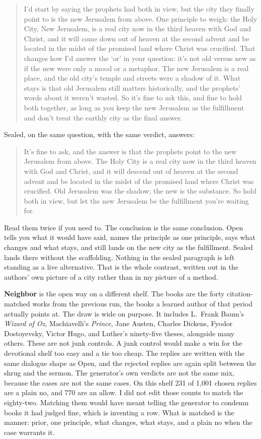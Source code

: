 \documentclass[11pt]{article}
\begin{document}
\begin{quote}
\small
I'd start by saying the prophets had both in view, but the city they finally point to is the new Jerusalem from above. One principle to weigh: the Holy City, New Jerusalem, is a real city now in the third heaven with God and Christ, and it will come down out of heaven at the second advent and be located in the midst of the promised land where Christ was crucified. That changes how I'd answer the `or' in your question: it's not old versus new as if the new were only a mood or a metaphor. The new Jerusalem is a real place, and the old city's temple and streets were a shadow of it. What stays is that old Jerusalem still matters historically, and the prophets' words about it weren't wasted. So it's fine to ask this, and fine to hold both together, as long as you keep the new Jerusalem as the fulfillment and don't treat the earthly city as the final answer.
\end{quote}

Sealed, on the same question, with the same verdict, answers:

\begin{quote}
\small
It's fine to ask, and the answer is that the prophets point to the new Jerusalem from above. The Holy City is a real city now in the third heaven with God and Christ, and it will descend out of heaven at the second advent and be located in the midst of the promised land where Christ was crucified. Old Jerusalem was the shadow; the new is the substance. So hold both in view, but let the new Jerusalem be the fulfillment you're waiting for.
\end{quote}

Read them twice if you need to. The conclusion is the same conclusion. Open tells you what it would have said, names the principle as one principle, says what changes and what stays, and still lands on the new city as the fulfillment. Sealed lands there without the scaffolding. Nothing in the sealed paragraph is left standing as a live alternative. That is the whole contrast, written out in the authors' own picture of a city rather than in my picture of a method.

\textbf{Neighbor} is the open way on a different shelf. The books are the forty citation-matched works from the previous run, the books a learned author of that period actually points at. The draw is wide on purpose. It includes L.\ Frank Baum's \emph{Wizard of Oz}, Machiavelli's \emph{Prince}, Jane Austen, Charles Dickens, Fyodor Dostoyevsky, Victor Hugo, and Luther's ninety-five theses, alongside many others. These are not junk controls. A junk control would make a win for the devotional shelf too easy and a tie too cheap. The replies are written with the same dialogue shape as Open, and the rejected replies are again split between the shrug and the sermon. The generator's own verdicts are not the same mix, because the cases are not the same cases. On this shelf 231 of 1,001 chosen replies are a plain no, and 770 are an allow. I did not edit those counts to match the eighty-two. Matching them would have meant telling the generator to condemn books it had judged fine, which is inventing a row. What is matched is the manner: prior, one principle, what changes, what stays, and a plain no when the case warrants it.
\end{document}

